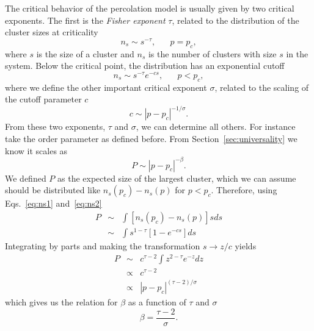 The critical behavior of the percolation model is usually given by two critical
exponents. The first is the \textit{Fisher exponent} $\tau$, related to
the distribution of the cluster sizes at criticality
\begin{equation}
    \label{eq:ns1}
    n_s\sim s^{-\tau},\;\;\;\;\;\;p=p_c,
\end{equation}
where $s$ is the size of a cluster and $n_s$ is the number of clusters with
size $s$ in the system. Below the critical point, the distribution has an
exponential cutoff
\begin{equation}
    \label{eq:ns2}
    n_s\sim s^{-\tau}e^{-cs},\;\;\;\;\;\;p<p_c,
\end{equation}
where we define the other important critical exponent $\sigma$, related
to the scaling of the cutoff parameter $c$
\begin{equation}
    \label{eq:sig}
    c\sim \left|p-p_c\right|^{-1/\sigma}.
\end{equation}
From these two exponents, $\tau$ and $\sigma$, we can determine all others.
For instance take the order parameter as defined before. From
Section~\ref{sec:universality} we know it scales as
\begin{equation}
    P\sim\left|p-p_c\right|^{-\beta}.
\end{equation}
We defined $P$ as the expected size of the largest cluster, which
we can assume should be distributed like $n_s(p_c)-n_s(p)$ for
$p < p_c$. Therefore, using Eqs.~\ref{eq:ns1} and~\ref{eq:ns2}
\begin{eqnarray}
    P & \sim & \int\left[n_{s}\left(p_{c}\right)-n_{s}\left(p\right)\right]sds\\
      & \sim & \int s^{1-\tau}\left[1-e^{-cs}\right]ds
\end{eqnarray}
Integrating by parts and making the transformation $s\rightarrow z/c$ yields
\begin{eqnarray}
P & \sim & c^{\tau-2}\int z^{2-\tau}e^{-z}dz\\
 & \propto & c^{\tau-2}\\
 & \propto & \left|p-p_{c}\right|^{\left(\tau-2\right)/\sigma}
\end{eqnarray}
which gives us the relation for $\beta$ as a function of $\tau$ and $\sigma$
\begin{equation}
    \beta=\frac{\tau-2}{\sigma}.
\end{equation}
    
